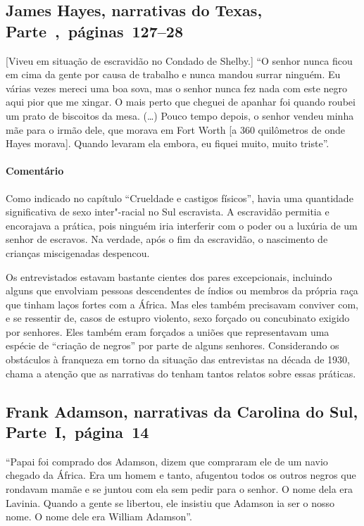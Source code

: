 \subsection{James Hayes, narrativas do Texas, Parte~,~páginas~127--28}
\label{ref130}

{[}Viveu em situação de escravidão no Condado de Shelby.{]} ``O senhor nunca ficou em cima da gente por causa de trabalho e nunca
mandou surrar ninguém. Eu várias vezes mereci uma boa sova, mas o senhor
nunca fez nada com este negro aqui pior que me xingar. O mais perto que
cheguei de apanhar foi quando roubei um prato de biscoitos da mesa.
(\ldots{}) Pouco tempo depois, o senhor vendeu minha mãe para o irmão
dele, que morava em Fort Worth {[}a 360 quilômetros de onde Hayes morava{]}.
Quando levaram ela embora, eu fiquei muito, muito triste''.

\paragraph{Comentário}\quad
{\small
Como indicado no capítulo ``Crueldade e castigos físicos'', havia uma quantidade significativa de
sexo inter"-racial no Sul escravista. A escravidão permitia e encorajava
a prática, pois ninguém iria interferir com o poder ou a luxúria de um
senhor de escravos. Na verdade, após o fim da escravidão, o nascimento
de crianças miscigenadas despencou.

Os entrevistados estavam bastante cientes dos pares excepcionais,
incluindo alguns que envolviam pessoas descendentes de índios ou membros
da própria raça que tinham laços fortes com a África. Mas eles também
precisavam conviver com, e se ressentir de, casos de estupro violento,
sexo forçado ou concubinato exigido por senhores. Eles também eram
forçados a uniões que representavam uma espécie de
``criação de negros'' por parte de alguns senhores. Considerando os
obstáculos à franqueza em torno da situação das entrevistas na década de
1930, chama a atenção que as narrativas do  tenham tantos relatos
sobre essas práticas.
}

\subsection{Frank Adamson, narrativas da Carolina do Sul, Parte~I,~página~14} \label{ref05}

``Papai foi comprado dos Adamson, dizem que compraram ele de um navio
chegado da África. Era um homem e tanto, afugentou todos os outros
negros que rondavam mamãe e se juntou com ela sem pedir para o senhor. O
nome dela era Lavinia. Quando a gente se libertou, ele insistiu que
Adamson ia ser o nosso nome. O nome dele era William Adamson''.

